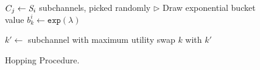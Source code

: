 


\begin{figure}[tbp]
\begin{minipage}{.45\textwidth}
\begin{algorithmic}[1]
 {\small
	

		
		\State $C_j \gets \id{S}_i$ subchannels, picked randomly
				\State $\triangleright$ Draw exponential bucket value 
				\State $b_k^i \gets \texttt{exp}(\lambda)$ 
		\EndFor
	
				\State $k' \gets$ subchannel with maximum utility
				\State swap $k$ with $k'$ 
			\EndIf
		\EndFor
	\EndFor
\EndFunction
}
\end{algorithmic}
\vspace{-6pt}
\caption{{Hopping Procedure.}} 
\vspace{-12pt}
\label{fig:hopping}
\end{minipage}
\vspace{-8pt}
\end{figure}


